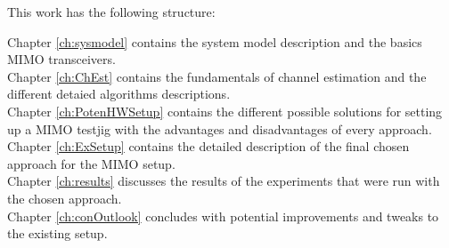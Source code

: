 \bigskip
\noindent This work has the following structure:

\bigskip
\noindent Chapter \ref{ch:sysmodel} contains the system model description and the basics MIMO transceivers.\\
Chapter \ref{ch:ChEst} contains the fundamentals of channel estimation and the different detaied algorithms descriptions. \\
Chapter \ref{ch:PotenHWSetup} contains the different possible solutions for setting up a MIMO testjig with the advantages and disadvantages of every approach. \\
Chapter \ref{ch:ExSetup} contains the detailed description of the final chosen approach for the MIMO setup. \\
Chapter \ref{ch:results} discusses the results of the experiments that were run with the chosen approach. \\
Chapter \ref{ch:conOutlook} concludes with potential improvements and tweaks to the existing setup.
